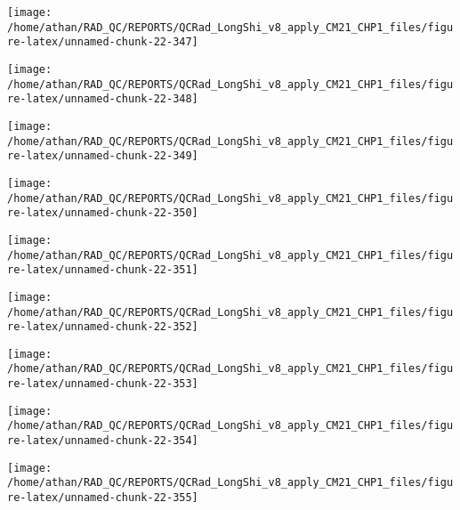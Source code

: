 \documentclass[
  10pt,
  a4paper,oneside]{article}
\begin{document}
\begin{center}\texttt{[image: /home/athan/RAD\_QC/REPORTS/QCRad\_LongShi\_v8\_apply\_CM21\_CHP1\_files/figure-latex/unnamed-chunk-22-347]} \end{center}

\begin{center}\texttt{[image: /home/athan/RAD\_QC/REPORTS/QCRad\_LongShi\_v8\_apply\_CM21\_CHP1\_files/figure-latex/unnamed-chunk-22-348]} \end{center}

\begin{center}\texttt{[image: /home/athan/RAD\_QC/REPORTS/QCRad\_LongShi\_v8\_apply\_CM21\_CHP1\_files/figure-latex/unnamed-chunk-22-349]} \end{center}

\begin{center}\texttt{[image: /home/athan/RAD\_QC/REPORTS/QCRad\_LongShi\_v8\_apply\_CM21\_CHP1\_files/figure-latex/unnamed-chunk-22-350]} \end{center}

\begin{center}\texttt{[image: /home/athan/RAD\_QC/REPORTS/QCRad\_LongShi\_v8\_apply\_CM21\_CHP1\_files/figure-latex/unnamed-chunk-22-351]} \end{center}

\begin{center}\texttt{[image: /home/athan/RAD\_QC/REPORTS/QCRad\_LongShi\_v8\_apply\_CM21\_CHP1\_files/figure-latex/unnamed-chunk-22-352]} \end{center}

\begin{center}\texttt{[image: /home/athan/RAD\_QC/REPORTS/QCRad\_LongShi\_v8\_apply\_CM21\_CHP1\_files/figure-latex/unnamed-chunk-22-353]} \end{center}

\begin{center}\texttt{[image: /home/athan/RAD\_QC/REPORTS/QCRad\_LongShi\_v8\_apply\_CM21\_CHP1\_files/figure-latex/unnamed-chunk-22-354]} \end{center}

\begin{center}\texttt{[image: /home/athan/RAD\_QC/REPORTS/QCRad\_LongShi\_v8\_apply\_CM21\_CHP1\_files/figure-latex/unnamed-chunk-22-355]} \end{center}
\end{document}
